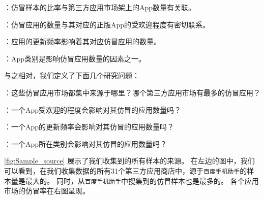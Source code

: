 \vspace{5mm}
：仿冒样本的比率与第三方应用市场架上的App数量有关联。

：仿冒应用的数量与其对应的正版App的受欢迎程度有密切联系。

：应用的更新频率影响着其对应仿冒应用的数量。

：App类别是影响仿冒应用数量的因素之一。
\vspace{5mm}

与之相对，我们定义了下面几个研究问题：

\vspace{5mm}
：这些仿冒应用市场都集中来源于哪里？哪个第三方应用市场有最多的仿冒应用？

：一个App受欢迎的程度会影响对其仿冒的应用数量吗？

：一个App的更新频率会影响对其仿冒的应用数量吗？

：一个App所在类别会影响对其仿冒的应用数量吗？
\vspace{5mm}

 \autoref{fig:Sample_source} 展示了我们收集到的所有样本的来源。
在左边的图中，我们可以看到，在我们收集数据的所有31个第三方应用商店中，源于\texttt{百度手机助手}的样本量是最大的。
同时，从\texttt{百度手机助手}中搜集到的仿冒样本也是最多的。
各个应用市场的仿冒率在右图呈现。

